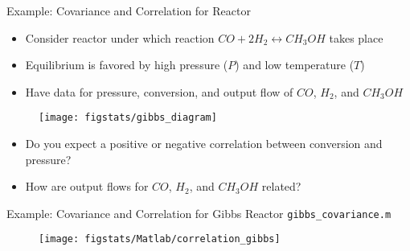 \documentclass[handout,9pt]{beamer}
\begin{document}
%
\begin{frame}{Example: Covariance and Correlation for Reactor}

\begin{itemize}
\setlength{\itemsep}{5pt}
\item Consider reactor under which reaction $CO+2H_2\leftrightarrow CH_3OH$ takes place
\item Equilibrium is favored by high pressure ($P$) and low temperature ($T$)
\item Have data for pressure, conversion, and output flow of $CO$, $H_2$, and $CH_3OH$
\end{itemize}

\begin{figure}[!htb]
    \centering
	\texttt{[image: figstats/gibbs\_diagram]}
\end{figure}

\begin{block}{}
\begin{itemize}
\item Do you expect a positive or negative correlation between conversion and pressure?
 \item How are output flows for $CO$, $H_2$, and $CH_3OH$ related?
\end{itemize}
\end{block}

\end{frame}


%
\begin{frame}{Example: Covariance and Correlation for Gibbs Reactor \footnotesize{\texttt{gibbs\_covariance.m}}}


\begin{figure}[!htb]
    \centering
	\texttt{[image: figstats/Matlab/correlation\_gibbs]}
\end{figure}



\end{frame}
\end{document}
